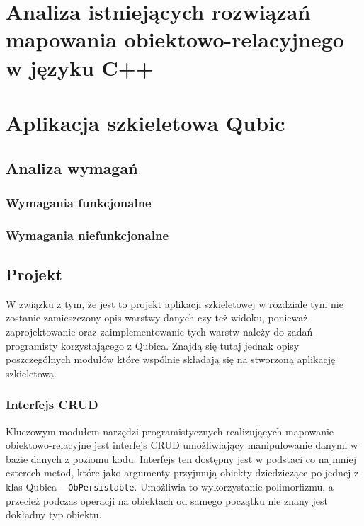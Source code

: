 \documentclass[12pt]{report}
\begin{document}
\chapter[Analiza istniejących rozwiązań]{Analiza istniejących rozwiązań mapowania obiektowo-relacyjnego w języku C++} \label{analiza}

\chapter{Aplikacja szkieletowa Qubic} \label{qubic}

\section{Analiza wymagań}

\subsection{Wymagania funkcjonalne}

\subsection{Wymagania niefunkcjonalne}

\section{Projekt} %

W związku z tym, że jest to projekt aplikacji szkieletowej w rozdziale tym nie zostanie zamieszczony opis warstwy danych czy też widoku, ponieważ zaprojektowanie oraz
zaimplementowanie tych warstw należy do zadań programisty ko\-rzy\-sta\-ją\-cego z Qubica. Znajdą się tutaj jednak opisy poszczególnych modułów które wspólnie składają się
na stworzoną aplikację szkieletową.

\subsection{Interfejs CRUD}

Kluczowym modułem narzędzi programistycznych realizujących mapowanie obiekt\-owo-relacyjne jest interfejs CRUD umożliwiający manipulowanie danymi w bazie danych z 
poziomu kodu. Interfejs ten dostępny jest w podstaci co najmniej czterech metod, które jako argumenty przyjmują obiekty dziedziczące po jednej z klas Qubica -- 
{\tt QbPersistable}. Umożliwia to wykorzystanie polimorfizmu, a przecież podczas operacji na obiektach od samego początku nie znany jest dokładny typ obiektu.
\end{document}
